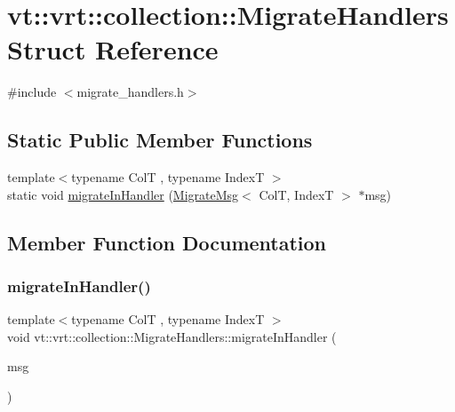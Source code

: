 \hypertarget{structvt_1_1vrt_1_1collection_1_1_migrate_handlers}{}\section{vt\+:\+:vrt\+:\+:collection\+:\+:Migrate\+Handlers Struct Reference}
\label{structvt_1_1vrt_1_1collection_1_1_migrate_handlers}


{\ttfamily \#include $<$migrate\+\_\+handlers.\+h$>$}

\subsection*{Static Public Member Functions}
\begin{DoxyCompactItemize}
\item 
{\footnotesize template$<$typename ColT , typename IndexT $>$ }\\static void \hyperlink{structvt_1_1vrt_1_1collection_1_1_migrate_handlers_ae79d416388bfee7121230fc54cc7f770}{migrate\+In\+Handler} (\hyperlink{structvt_1_1vrt_1_1collection_1_1_migrate_msg}{Migrate\+Msg}$<$ ColT, IndexT $>$ $\ast$msg)
\end{DoxyCompactItemize}


\subsection{Member Function Documentation}
\mbox{\label{structvt_1_1vrt_1_1collection_1_1_migrate_handlers_ae79d416388bfee7121230fc54cc7f770}} 
\subsubsection{\texorpdfstring{migrate\+In\+Handler()}{migrateInHandler()}}
{\footnotesize\ttfamily template$<$typename ColT , typename IndexT $>$ \\
void vt\+::vrt\+::collection\+::\+Migrate\+Handlers\+::migrate\+In\+Handler (\begin{DoxyParamCaption}\item[{\hyperlink{structvt_1_1vrt_1_1collection_1_1_migrate_msg}{Migrate\+Msg}$<$ ColT, IndexT $>$ $\ast$}]{msg }\end{DoxyParamCaption})\hspace{0.3cm}{\ttfamily [static]}}



